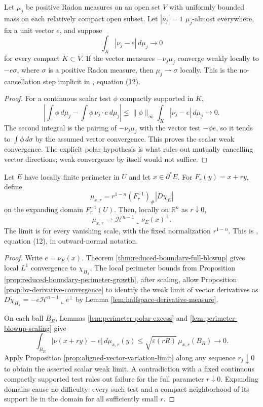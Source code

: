 \begin{proposition}\label{prop:aligned-vector-variation-limit}
Let $\mu_j$ be positive Radon measures on an open set $V$ with uniformly bounded mass on each relatively compact open subset. Let $|\nu_j|=1$ $\mu_j$-almost everywhere, fix a unit vector $e$, and suppose
\[
 \int_K|\nu_j-e|\,d\mu_j\longrightarrow0
\]
for every compact $K\subset V$. If the vector measures $-\nu_j\mu_j$ converge weakly locally to $-e\sigma$, where $\sigma$ is a positive Radon measure, then $\mu_j\rightharpoonup\sigma$ locally. This is the no-cancellation step implicit in \cite{Sim18}, equation (12).
\end{proposition}
\begin{proof}
For a continuous scalar test $\phi$ compactly supported in $K$,
\[
 \left|\int\phi\,d\mu_j-\int\phi\,\nu_j\cdot e\,d\mu_j\right|
 \leq\|\phi\|_\infty\int_K|\nu_j-e|\,d\mu_j\longrightarrow0.
\]
The second integral is the pairing of $-\nu_j\mu_j$ with the vector test $-\phi e$, so it tends to $\int\phi\,d\sigma$ by the assumed vector convergence. This proves the scalar weak convergence. The explicit polar hypothesis is what rules out mutually cancelling vector directions; weak convergence by itself would not suffice.
\end{proof}

\begin{theorem}\label{thm:reduced-boundary-perimeter-tangent}
Let $E$ have locally finite perimeter in $U$ and let $x\in\partial^*E$. For $F_r(y)=x+ry$, define
\[
 \mu_{x,r}=r^{1-n}(F_r^{-1})_\#|D\chi_E|
\]
on the expanding domain $F_r^{-1}(U)$. Then, locally on $\mathbb R^n$ as $r\downarrow0$,
\[
 \mu_{x,r}\rightharpoonup\mathcal H^{n-1}\llcorner\nu_E(x)^\perp.
\]
The limit is for every vanishing scale, with the fixed normalization $r^{1-n}$. This is \cite{Sim18}, equation (12), in outward-normal notation.
\end{theorem}
\begin{proof}
Write $e=\nu_E(x)$. Theorem \ref{thm:reduced-boundary-full-blowup} gives local $L^1$ convergence to $\chi_{H_x}$. The local perimeter bounds from Proposition \ref{prop:reduced-boundary-perimeter-growth}, after scaling, allow Proposition \ref{prop:bv-derivative-convergence} to identify the weak limit of vector derivatives as $D\chi_{H_x}=-e\mathcal H^{n-1}\llcorner e^\perp$ by Lemma \ref{lem:halfspace-derivative-measure}.

On each ball $B_R$, Lemmas \ref{lem:perimeter-polar-excess} and \ref{lem:perimeter-blowup-scaling} give
\[
 \int_{B_R}|\nu(x+ry)-e|\,d\mu_{x,r}(y)
 \leq\sqrt{\varepsilon(rR)}\,\mu_{x,r}(B_R)\longrightarrow0.
\]
Apply Proposition \ref{prop:aligned-vector-variation-limit} along any sequence $r_j\downarrow0$ to obtain the asserted scalar weak limit. A contradiction with a fixed continuous compactly supported test rules out failure for the full parameter $r\downarrow0$. Expanding domains cause no difficulty: every such test and a compact neighborhood of its support lie in the domain for all sufficiently small $r$.
\end{proof}

